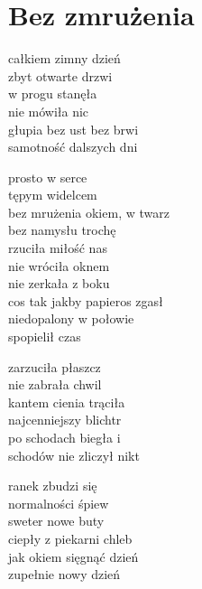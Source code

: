 \section{Bez zmrużenia}
\begin{text}
    \small{
całkiem zimny dzień\\
zbyt otwarte drzwi\\
w progu stanęła\\
nie mówiła nic\\
głupia bez ust bez brwi\\
samotność dalszych dni

\vin prosto w serce\\
\vin tępym widelcem\\
\vin bez mrużenia okiem, w twarz\\
\vin bez namysłu trochę\\
\vin rzuciła miłość nas\\
\vin nie wróciła oknem\\
\vin nie zerkała z boku\\
\vin cos tak jakby papieros zgasł\\
\vin niedopalony w połowie\\
\vin spopielił czas

zarzuciła płaszcz\\
nie zabrała chwil\\
kantem cienia trąciła\\
najcenniejszy blichtr\\
po schodach biegła i\\
schodów nie zliczył nikt

ranek zbudzi się\\
normalności śpiew\\
sweter nowe buty\\
ciepły z piekarni chleb\\
jak okiem sięgnąć dzień\\
zupełnie nowy dzień
    }
\end{text}